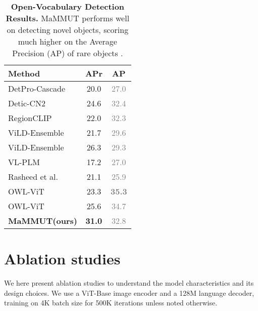 \documentclass[10pt]{article} \usepackage[accepted]{tmlr}
\newcommand{\tablestyle}[2]{\setlength{\tabcolsep}{#1}\renewcommand{\arraystretch}{#2}\centering\footnotesize}
\newcommand{\gray}[1]{\textcolor{gray}{{#1}}}
\newcommand{\ours}{MaMMUT\xspace}
\begin{document}
\begin{table}[t]
\centering
\small
\tablestyle{8pt}{1.1}
\begin{tabular}{l|c|c}
Method	&APr &AP  \\
\hline
DetPro-Cascade~\citep{du2022learning}  & 20.0 &\gray{27.0}\\
Detic-CN2~\citep{zhou2022detecting} & 24.6 &\gray{32.4}\\
RegionCLIP~\citep{zhong2021regionclip} & 22.0 &\gray{32.3}\\
ViLD-Ensemble~\citep{gu2022openvocabulary} & 21.7 &\gray{29.6}\\
ViLD-Ensemble~\citep{gu2022openvocabulary} & 26.3 &\gray{29.3}\\
VL-PLM~\citep{zhao2022exploiting} & 17.2 &\gray{27.0}\\
Rasheed et al.~\citep{rasheed2022bridging} & 21.1 &\gray{25.9} \\
OWL-ViT~\citep{minderer2022simple} & 23.3 & \textbf{\gray{35.3}}\\
OWL-ViT~\citep{minderer2022simple} &25.6 &\gray{34.7}\\
\hline
\textbf{\ours (ours)} 	& \textbf{31.0} & \gray{32.8} \\ 
\hline
\end{tabular}
\vspace{2mm}
\caption{\textbf{Open-Vocabulary Detection Results.} \ours performs well on detecting novel objects, scoring much higher on the Average Precision (AP) of rare objects . 
}
\label{tab:ovd}
\vspace{-2mm}
\end{table}



\section{Ablation studies}
\label{sec:ablation}

We here present ablation studies  to understand the model characteristics and its design choices. We use a ViT-Base image encoder and a 128M language decoder, training on 4K batch size for 500K iterations unless noted otherwise.
\end{document}
